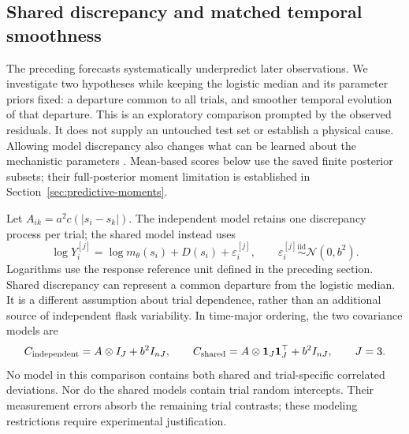 \subsection{Shared discrepancy and matched temporal smoothness}

    The preceding forecasts systematically underpredict later observations.
    We investigate two hypotheses while keeping the logistic median and its
    parameter priors fixed: a departure common to all trials, and smoother
    temporal evolution of that departure. This is an exploratory comparison
    prompted by the observed residuals. It does not supply an untouched test
    set or establish a physical cause. Allowing model discrepancy also changes
    what can be learned about the mechanistic parameters
    \citep{brynjarsdottir2014discrepancy}.
    Mean-based scores below use the saved finite posterior subsets; their
    full-posterior moment limitation is established in
    Section~\ref{sec:predictive-moments}.

    Let \(A_{ik}=a^2 c(|s_i-s_k|)\). The independent model retains one
    discrepancy process per trial; the shared model instead uses
    \[
        \log Y_i^{[j]}=\log m_\theta(s_i)+D(s_i)+\varepsilon_i^{[j]},
        \qquad \varepsilon_i^{[j]}\overset{\mathrm{iid}}{\sim}\mathcal N(0,b^2).
    \]
    Logarithms use the response reference unit defined in the preceding
    section. Shared discrepancy can represent a common departure from the
    logistic median. It is a different assumption about trial dependence,
    rather than an additional source of independent flask variability.
    In time-major ordering, the two covariance models are
    \[
        C_{\rm independent}=A\otimes I_J+b^2 I_{nJ},\qquad
        C_{\rm shared}=A\otimes\boldsymbol 1_J\boldsymbol 1_J^\top+b^2 I_{nJ},
        \qquad J=3.
    \]
    No model in this comparison contains both shared and trial-specific
    correlated deviations. Nor do the shared models contain trial random
    intercepts. Their measurement errors absorb the remaining trial contrasts;
    these modeling restrictions require experimental justification.

